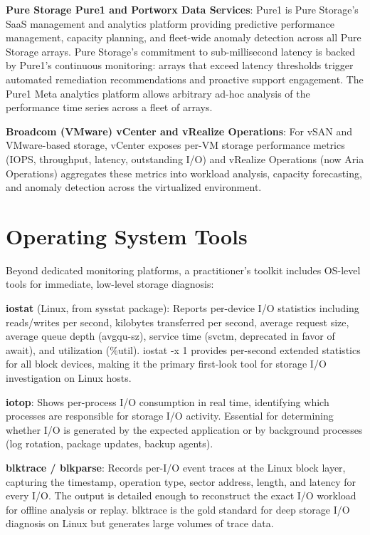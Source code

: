 \textbf{Pure Storage Pure1 and Portworx Data Services}: Pure1 is Pure Storage's SaaS management and analytics platform providing predictive performance management, capacity planning, and fleet-wide anomaly detection across all Pure Storage arrays. Pure Storage's commitment to sub-millisecond latency is backed by Pure1's continuous monitoring: arrays that exceed latency thresholds trigger automated remediation recommendations and proactive support engagement. The Pure1 Meta analytics platform allows arbitrary ad-hoc analysis of the performance time series across a fleet of arrays.

\textbf{Broadcom (VMware) vCenter and vRealize Operations}: For vSAN and VMware-based storage, vCenter exposes per-VM storage performance metrics (IOPS, throughput, latency, outstanding I/O) and vRealize Operations (now Aria Operations) aggregates these metrics into workload analysis, capacity forecasting, and anomaly detection across the virtualized environment.

\section{Operating System Tools}
Beyond dedicated monitoring platforms, a practitioner's toolkit includes OS-level tools for immediate, low-level storage diagnosis:

\textbf{iostat} (Linux, from sysstat package): Reports per-device I/O statistics including reads/writes per second, kilobytes transferred per second, average request size, average queue depth (avgqu-sz), service time (svctm, deprecated in favor of await), and utilization (\%util). iostat -x 1 provides per-second extended statistics for all block devices, making it the primary first-look tool for storage I/O investigation on Linux hosts.

\textbf{iotop}: Shows per-process I/O consumption in real time, identifying which processes are responsible for storage I/O activity. Essential for determining whether I/O is generated by the expected application or by background processes (log rotation, package updates, backup agents).

\textbf{blktrace / blkparse}: Records per-I/O event traces at the Linux block layer, capturing the timestamp, operation type, sector address, length, and latency for every I/O. The output is detailed enough to reconstruct the exact I/O workload for offline analysis or replay. blktrace is the gold standard for deep storage I/O diagnosis on Linux but generates large volumes of trace data.

